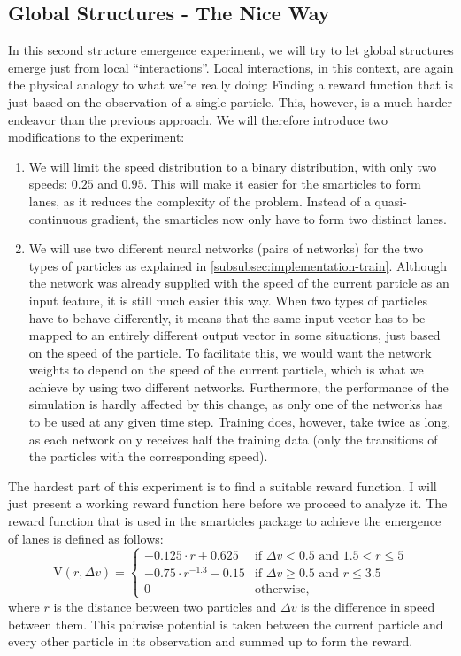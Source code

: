 \subsection{Global Structures - The Nice Way}
\label{subsec:global_structure_nice}
In this second structure emergence experiment, we will try to let global structures emerge just from local \enquote{interactions}. Local interactions, in this context, are again the physical analogy to what we're really doing: Finding a reward function that is just based on the observation of a single particle. This, however, is a much harder endeavor than the previous approach. We will therefore introduce two modifications to the experiment:
\begin{enumerate}
    \item We will limit the speed distribution to a binary distribution, with only two speeds: $0.25$ and $0.95$. This will make it easier for the smarticles to form lanes, as it reduces the complexity of the problem. Instead of a quasi-continuous gradient, the smarticles now only have to form two distinct lanes.
    \item We will use two different neural networks (pairs of networks) for the two types of particles as explained in \ref{subsubsec:implementation-train}. Although the network was already supplied with the speed of the current particle as an input feature, it is still much easier this way. When two types of particles have to behave differently, it means that the same input vector has to be mapped to an entirely different output vector in some situations, just based on the speed of the particle. To facilitate this, we would want the network weights to depend on the speed of the current particle, which is what we achieve by using two different networks. Furthermore, the performance of the simulation is hardly affected by this change, as only one of the networks has to be used at any given time step. Training does, however, take twice as long, as each network only receives half the training data (only the transitions of the particles with the corresponding speed).
\end{enumerate}
The hardest part of this experiment is to find a suitable reward function. I will just present a working reward function here before we proceed to analyze it. The reward function that is used in the smarticles package to achieve the emergence of lanes is defined as follows:
\begin{equation}
    \text{V}(r, \Delta v) = \begin{cases}
        -0.125 \cdot r + 0.625 & \text{if } \Delta v < 0.5 \text{ and } 1.5 < r \le 5 \\
        -0.75 \cdot r^{-1.3} - 0.15 & \text{if } \Delta v \ge 0.5 \text{ and } r \le 3.5 \\
        0 & \text{otherwise} \text{,}
    \end{cases}
    \label{eq:lane_reward_func}
\end{equation}
where $r$ is the distance between two particles and $\Delta v$ is the difference in speed between them. This pairwise potential is taken between the current particle and every other particle in its observation and summed up to form the reward. 


